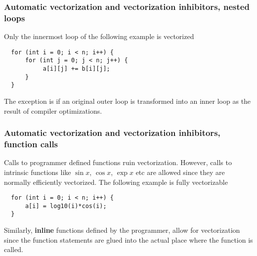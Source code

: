 \documentclass{beamer}
\begin{document}
\begin{frame}
\frametitle{Automatic vectorization and vectorization inhibitors, nested loops}

Only the innermost loop of the following example is vectorized






\begin{verbatim}
  for (int i = 0; i < n; i++) {
      for (int j = 0; j < n; j++) {
           a[i][j] += b[i][j];
      }  
  }

\end{verbatim}

The exception is if an original outer loop is transformed into an inner loop as the result of compiler optimizations.
\end{frame}

\begin{frame}
\frametitle{Automatic vectorization and vectorization inhibitors, function calls}

Calls to programmer defined functions ruin vectorization. However, calls to intrinsic functions like
$\sin{x}$, $\cos{x}$, $\exp{x}$ etc are allowed since they are normally efficiently vectorized. 
The following example is fully vectorizable




\begin{verbatim}
  for (int i = 0; i < n; i++) {
      a[i] = log10(i)*cos(i);
  }

\end{verbatim}

Similarly, \textbf{inline} functions defined by the programmer, allow for vectorization since the function statements are glued into the actual place where the function is called.
\end{frame}
\end{document}
